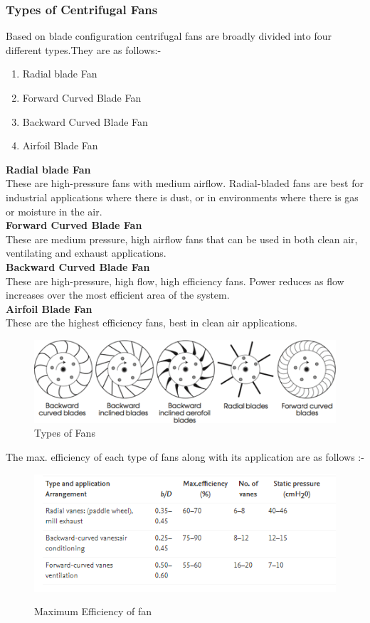 \documentclass[11pt]{article}
\begin{document}
\subsubsection{Types of Centrifugal Fans}

Based on blade configuration centrifugal fans are broadly divided into four different types.They are as follows:-
\begin{enumerate}
\item Radial blade Fan
\item Forward Curved Blade Fan
\item Backward Curved Blade Fan
\item Airfoil Blade Fan 

\end{enumerate}

\textbf{Radial blade Fan}\\
These are high-pressure fans with medium airflow. Radial-bladed fans are best for industrial applications where there is dust, or in environments where there is gas or moisture in the air.\\
\textbf{Forward Curved Blade Fan}\\
These are medium pressure, high airflow fans that can be used in both clean air, ventilating and exhaust applications.\\
\textbf{Backward Curved Blade Fan}\\
These are high-pressure, high flow, high efficiency fans. Power reduces as flow increases over the most efficient area of the system.\\
\textbf{Airfoil Blade Fan}\\
These are the highest efficiency fans, best in clean air applications.\\

\begin{figure}[h!]
\includegraphics[scale=1]{fans.png}
\caption{Types of Fans}
\end{figure}
\clearpage
The max. efficiency of each type of fans along with its application are as follows :- \\
\begin{figure}[h!]
\includegraphics[scale=1]{efficiency.png}\\
\centering
\caption{Maximum Efficiency of fan}
\end{figure}
\end{document}
